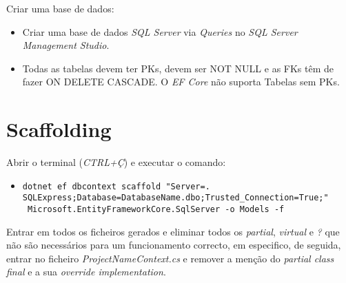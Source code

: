 Criar uma base de dados:

\begin{itemize}

  \item Criar uma base de dados \textit{SQL Server} via \textit{Queries} no \textit{SQL Server Management Studio}.
  \item Todas as tabelas devem ter PKs, devem ser NOT NULL e as FKs têm de fazer ON DELETE CASCADE. O \textit{EF Core} não suporta Tabelas sem PKs.
\end{itemize}

\section{Scaffolding}

Abrir o terminal (\textit{CTRL+Ç}) e executar o comando:

\begin{itemize}
  \item \texttt{dotnet\ ef\ dbcontext\ scaffold\ "Server=.\\SQLExpress;Database=DatabaseName.dbo;Trusted\_Connection=True;"}\\\texttt{\ Microsoft.EntityFrameworkCore.SqlServer\ -o Models -f}
\end{itemize}

Entrar em todos os ficheiros gerados e eliminar todos os \textit{partial},
\textit{virtual} e \textit{?} que não são necessários para um funcionamento correcto, em especifico, de
seguida, entrar no ficheiro \textit{ProjectNameContext.cs} e remover a menção do
\textit{partial class final} e a sua \textit{override implementation}.
